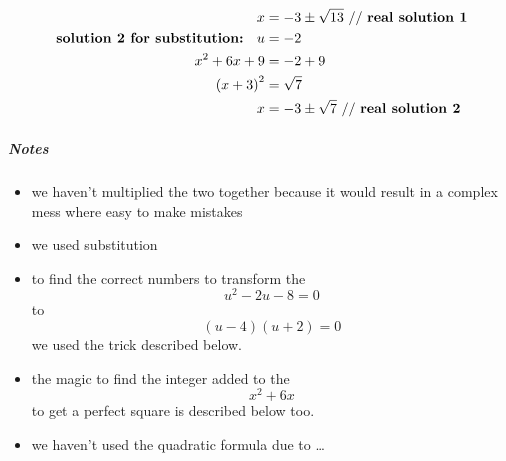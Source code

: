 \documentclass{article}
\begin{document}
\begin{align*}
	x                                                     & = -3 \pm \sqrt{13} \text{ // \textbf{real solution 1}}             \\
	\text{ \textbf{solution 2 for substitution: } } u     & = -2                                                               \\
	x^2 + 6x + 9                                          & = -2 + 9                                                           \\
	\left( x + 3 \right)^2                                & = \sqrt{7}                                                         \\
	x                                                     & = -3 \pm \sqrt{7} \text{ // \textbf{real solution 2}}              \\
\end{align*}

\subparagraph{Notes}
\begin{itemize}
	\item we haven't multiplied the two together because it would result in a complex mess where
	      easy to make mistakes
	\item we used substitution
	\item to find the correct numbers to transform the $$ u^2 - 2u - 8 = 0 $$ to $$ \left( u - 4 \right)\left( u + 2 \right) = 0 $$ we used the trick described below.
	\item the magic to find the integer added to the $$ x^2 + 6x $$ to get a perfect square is
	      described below too.
	\item we haven't used the quadratic formula due to \dots
\end{itemize}

\end{document}
